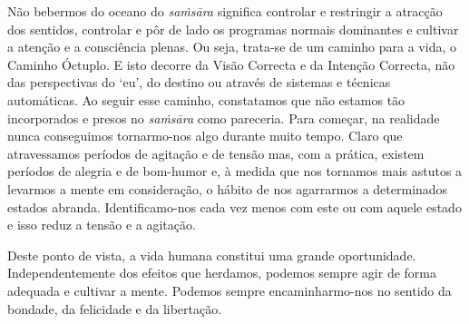 Não bebermos do oceano do \emph{saṁsāra} significa controlar e restringir a
atracção dos sentidos, controlar e pôr de lado os programas normais dominantes e
cultivar a atenção e a consciência plenas. Ou seja, trata-se de um caminho para
a vida, o Caminho Óctuplo. E isto decorre da Visão Correcta e da Intenção
Correcta, não das perspectivas do `eu', do destino ou através de sistemas e
técnicas automáticas. Ao seguir esse caminho, constatamos que não estamos tão
incorporados e presos no \emph{saṁsāra} como pareceria. Para começar, na
realidade nunca conseguimos tornarmo-nos algo durante muito tempo. Claro que
atravessamos períodos de agitação e de tensão mas, com a prática, existem
períodos de alegria e de bom-humor e, à medida que nos tornamos mais astutos a
levarmos a mente em consideração, o hábito de nos agarrarmos a determinados
estados abranda. Identificamo-nos cada vez menos com este ou com aquele estado e
isso reduz a tensão e a agitação.

Deste ponto de vista, a vida humana constitui uma grande oportunidade.
Independentemente dos efeitos que herdamos, podemos sempre agir de forma
adequada e cultivar a mente. Podemos sempre encaminharmo-nos no sentido da
bondade, da felicidade e da libertação.
